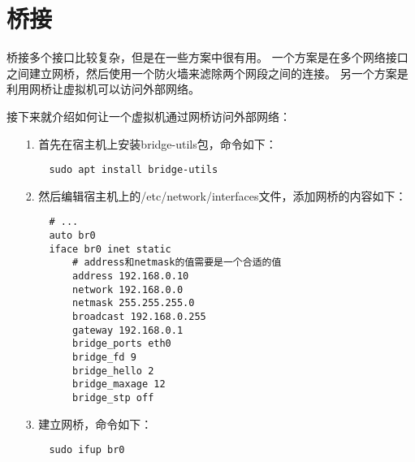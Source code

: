 \documentclass[a4paper,left=2.5cm,right=2.5cm,11pt]{article}
\begin{document}
\section{桥接}
	桥接多个接口比较复杂，但是在一些方案中很有用。
	一个方案是在多个网络接口之间建立网桥，然后使用一个防火墙来滤除两个网段之间的连接。
	另一个方案是利用网桥让虚拟机可以访问外部网络。\par
	接下来就介绍如何让一个虚拟机通过网桥访问外部网络：
	\begin{itemize}
		\item[1.] 首先在宿主机上安装bridge-utils包，命令如下：
	\begin{lstlisting}
	sudo apt install bridge-utils
	\end{lstlisting}

		\item[2.] 然后编辑宿主机上的/etc/network/interfaces文件，添加网桥的内容如下：
		\begin{lstlisting}
	# ...
	auto br0
	iface br0 inet static
		# address和netmask的值需要是一个合适的值
		address 192.168.0.10
		network 192.168.0.0
		netmask 255.255.255.0
		broadcast 192.168.0.255
		gateway 192.168.0.1
		bridge_ports eth0
		bridge_fd 9
		bridge_hello 2
		bridge_maxage 12
		bridge_stp off
		\end{lstlisting}

		\item[3.] 建立网桥，命令如下：
		\begin{lstlisting}
	sudo ifup br0
		\end{lstlisting}
	\end{itemize}
\end{document}
